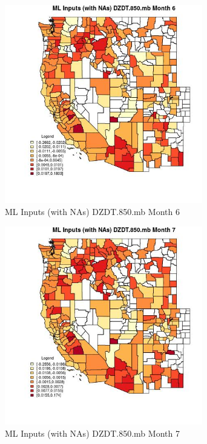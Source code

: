 \begin{figure} 
\centering  
\includegraphics[width=0.77\textwidth]{Code_Outputs/Report_ML_input_PM25_Step4_part_f_de_duplicated_aveswNAs_CountyDZDT850mbmedianMonth6.jpg} 
\caption{\label{fig:Report_ML_input_PM25_Step4_part_f_de_duplicated_aveswNAsCountyDZDT850mbmedianMonth6}ML Inputs (with NAs) DZDT.850.mb Month 6} 
\end{figure} 
 

\begin{figure} 
\centering  
\includegraphics[width=0.77\textwidth]{Code_Outputs/Report_ML_input_PM25_Step4_part_f_de_duplicated_aveswNAs_CountyDZDT850mbmedianMonth7.jpg} 
\caption{\label{fig:Report_ML_input_PM25_Step4_part_f_de_duplicated_aveswNAsCountyDZDT850mbmedianMonth7}ML Inputs (with NAs) DZDT.850.mb Month 7} 
\end{figure} 
 

